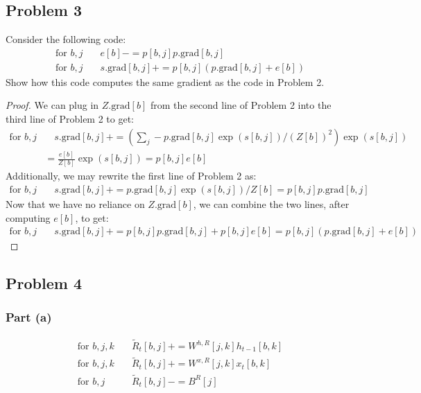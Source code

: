\documentclass{amsart}
\theoremstyle{definition}
\begin{document}
\subsection*{Problem 3}
Consider the following code:
\begin{align*}
    \text{for } b, j &\quad e[b] -= p[b,j] p.\text{grad}[b,j] \\
    \text{for } b, j &\quad s.\text{grad}[b,j] += p[b,j](p.\text{grad}[b,j] + e[b])
\end{align*}
Show how this code computes the same gradient as the code in Problem 2.
\begin{proof}
    We can plug in $Z.\text{grad}[b]$ from the second line of Problem 2 into the third line of Problem 2 to get:
    \begin{align*}
        \text{for } b, j &\quad s.\text{grad}[b,j] += \left(
            \sum_j - p.\text{grad}[b,j] \exp(s[b,j])/(Z[b])^2
        \right) \exp(s[b,j])\\
        &= \frac{e[b]}{Z[b]} \exp(s[b,j]) = p[b,j] e[b]
    \end{align*}
    Additionally, we may rewrite the first line of Problem 2 as:
    \begin{align*}
        \text{for } b, j &\quad s.\text{grad}[b,j] += p.\text{grad}[b,j]  \exp(s[b,j])/Z[b] = p[b,j] p.\text{grad}[b,j]
    \end{align*}
    Now that we have no reliance on $Z.\text{grad}[b]$, we can combine the two lines, after computing $e[b]$, to get:
    \begin{align*}
        \text{for } b, j &\quad s.\text{grad}[b,j] += p[b,j] p.\text{grad}[b,j] + p[b,j] e[b] = p[b,j](p.\text{grad}[b,j] + e[b])
    \end{align*}
\end{proof}

\subsection*{Problem 4}
\subsubsection*{Part (a)}
\begin{align*}
    \text{for } b, j, k &\quad \tilde{R}_t[b, j] += W^{h, R}[j, k] h_{t-1}[b, k]\\
    \text{for } b, j, k &\quad \tilde{R}_t[b, j] += W^{x, R}[j, k] x_t[b, k]\\
    \text{for } b, j &\quad \tilde{R}_t[b, j] -= B^R[j]
\end{align*}
\end{document}
